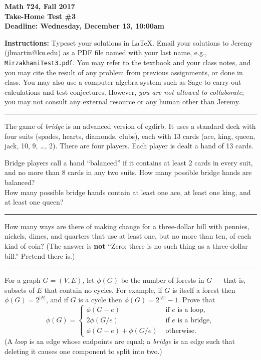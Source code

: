 

\thispagestyle{empty}

\textbf{Math 724, Fall 2017\\
Take-Home Test \#3\\
Deadline: Wednesday, December 13, 10:00am}

\textbf{Instructions:} Typeset your solutions in LaTeX.  Email your solutions to Jeremy (jlmartin@ku.edu) as a PDF file named with your last name, e.g., {\tt MirzakhaniTest3.pdf}.  You may refer to the textbook and your class notes, and you may cite the result of any problem from previous assignments, or done in class.  You may also use a computer algebra system such as Sage to carry out calculations and test conjectures.  However, \emph{you are not allowed to collaborate}; you may not consult any external resource or any human other than Jeremy.
\medskip\hrule

\prob
The game of \emph{bridge} is an advanced version of egdirb.  It uses a standard deck with four suits (spades, hearts, diamonds, clubs), each with 13 cards (ace, king, queen, jack, 10, 9, \dots, 2).  There are four players.  Each player is dealt  a hand of 13 cards.

 Bridge players call a hand ``balanced'' if it contains at least 2 cards in every suit, and no more than 8 cards in any two suits.  How many possible bridge hands are balanced?\\
 How many possible bridge hands contain at least one ace, at least one king, and at least one queen?

\bigskip\hrule

 How many ways are there of making change for a three-dollar bill with pennies, nickels, dimes, and quarters that use
at least one, but no more than ten, of each kind of coin?
(The answer is {\bf not} ``Zero; there is no such thing as a three-dollar bill.''  Pretend there is.)

\bigskip\hrule

For a graph $G=(V,E)$, let $\phi(G)$ be the number of forests in $G$ --- that is, subsets of $E$ that contain no cycles.
For example, if $G$ is itself a forest then $\phi(G)=2^{|E|}$, and if $G$ is a cycle then $\phi(G)=2^{|E|}-1$.
Prove that
\[\phi(G)=\begin{cases}
\phi(G-e) & \text{ if $e$ is a loop},\\
2\phi(G/e) & \text{ if $e$ is a bridge},\\
\phi(G-e)+\phi(G/e)& \text{ otherwise.}
\end{cases}\]
(A \emph{loop} is an edge whose endpoints are equal; a \emph{bridge} is an edge such that deleting it causes one component to split into two.)


